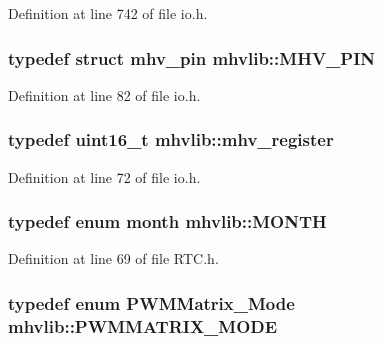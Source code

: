 Definition at line 742 of file io.\-h.

\hypertarget{namespacemhvlib_a3fc44352ee2826fe480452ba1acd5de7}{
\subsubsection[{M\-H\-V\-\_\-\-P\-I\-N}]{\setlength{\rightskip}{0pt plus 5cm}typedef struct {\bf mhv\-\_\-pin} {\bf mhvlib\-::\-M\-H\-V\-\_\-\-P\-I\-N}}}\label{namespacemhvlib_a3fc44352ee2826fe480452ba1acd5de7}


Definition at line 82 of file io.\-h.

\hypertarget{namespacemhvlib_a0c171f0b162817f27df6c10c611a0f37}{
\subsubsection[{mhv\-\_\-register}]{\setlength{\rightskip}{0pt plus 5cm}typedef uint16\-\_\-t {\bf mhvlib\-::mhv\-\_\-register}}}\label{namespacemhvlib_a0c171f0b162817f27df6c10c611a0f37}


Definition at line 72 of file io.\-h.

\hypertarget{namespacemhvlib_a2406fef93804eb87fef77054c6a2082c}{
\subsubsection[{M\-O\-N\-T\-H}]{\setlength{\rightskip}{0pt plus 5cm}typedef enum {\bf month} {\bf mhvlib\-::\-M\-O\-N\-T\-H}}}\label{namespacemhvlib_a2406fef93804eb87fef77054c6a2082c}


Definition at line 69 of file R\-T\-C.\-h.

\hypertarget{namespacemhvlib_a65e3004ad916bc283b80fb7e2a7f29b7}{
\subsubsection[{P\-W\-M\-M\-A\-T\-R\-I\-X\-\_\-\-M\-O\-D\-E}]{\setlength{\rightskip}{0pt plus 5cm}typedef enum {\bf P\-W\-M\-Matrix\-\_\-\-Mode} {\bf mhvlib\-::\-P\-W\-M\-M\-A\-T\-R\-I\-X\-\_\-\-M\-O\-D\-E}}}\label{namespacemhvlib_a65e3004ad916bc283b80fb7e2a7f29b7}


